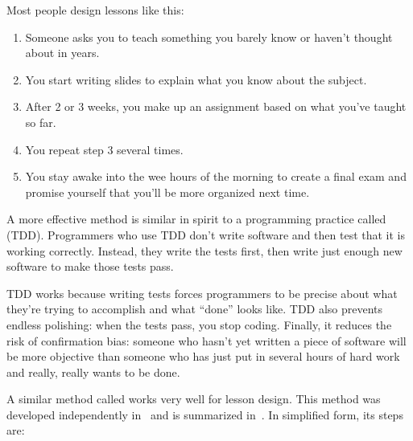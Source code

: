 
Most people design lessons like this:

\begin{enumerate}

\item
  Someone asks you to teach something you barely know
  or haven't thought about in years.

\item
  You start writing slides to explain what you know about the subject.

\item
  After 2 or 3 weeks,
  you make up an assignment based on what you've taught so far.

\item
  You repeat step 3 several times.

\item
  You stay awake into the wee hours of the morning
  to create a final exam
  and promise yourself that you'll be more organized next time.

\end{enumerate}

A more effective method is similar in spirit to a programming practice called
 (TDD).
Programmers who use TDD don't write software
and then test that it is working correctly.
Instead,
they write the tests first,
then write just enough new software to make those tests pass.

TDD works because writing tests forces programmers to be precise about
what they're trying to accomplish and what ``done'' looks like.
TDD also prevents endless polishing:
when the tests pass, you stop coding.
Finally,
it reduces the risk of confirmation bias:
someone who hasn't yet written a piece of software
will be more objective than someone who has just put in several hours of hard work
and really, really wants to be done.

A similar method called  works very well for lesson design.
This method was developed independently in~\cite{Wigg2005,Bigg2011,Fink2013}
and is summarized in~\cite{McTi2013}.
In simplified form, its steps are:

